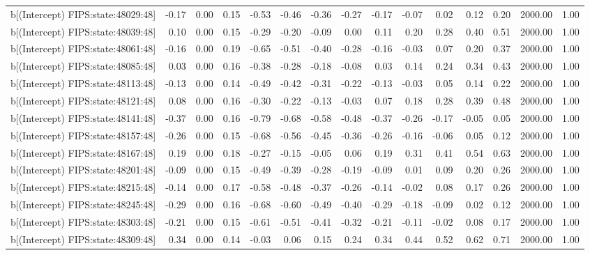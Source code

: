 \begin{table}[ht]
\begin{tabular}{rrrrrrrrrrrrrrr}
  b[(Intercept) FIPS:state:48029:48] & -0.17 & 0.00 & 0.15 & -0.53 & -0.46 & -0.36 & -0.27 & -0.17 & -0.07 & 0.02 & 0.12 & 0.20 & 2000.00 & 1.00 \\ 
  b[(Intercept) FIPS:state:48039:48] & 0.10 & 0.00 & 0.15 & -0.29 & -0.20 & -0.09 & 0.00 & 0.11 & 0.20 & 0.28 & 0.40 & 0.51 & 2000.00 & 1.00 \\ 
  b[(Intercept) FIPS:state:48061:48] & -0.16 & 0.00 & 0.19 & -0.65 & -0.51 & -0.40 & -0.28 & -0.16 & -0.03 & 0.07 & 0.20 & 0.37 & 2000.00 & 1.00 \\ 
  b[(Intercept) FIPS:state:48085:48] & 0.03 & 0.00 & 0.16 & -0.38 & -0.28 & -0.18 & -0.08 & 0.03 & 0.14 & 0.24 & 0.34 & 0.43 & 2000.00 & 1.00 \\ 
  b[(Intercept) FIPS:state:48113:48] & -0.13 & 0.00 & 0.14 & -0.49 & -0.42 & -0.31 & -0.22 & -0.13 & -0.03 & 0.05 & 0.14 & 0.22 & 2000.00 & 1.00 \\ 
  b[(Intercept) FIPS:state:48121:48] & 0.08 & 0.00 & 0.16 & -0.30 & -0.22 & -0.13 & -0.03 & 0.07 & 0.18 & 0.28 & 0.39 & 0.48 & 2000.00 & 1.00 \\ 
  b[(Intercept) FIPS:state:48141:48] & -0.37 & 0.00 & 0.16 & -0.79 & -0.68 & -0.58 & -0.48 & -0.37 & -0.26 & -0.17 & -0.05 & 0.05 & 2000.00 & 1.00 \\ 
  b[(Intercept) FIPS:state:48157:48] & -0.26 & 0.00 & 0.15 & -0.68 & -0.56 & -0.45 & -0.36 & -0.26 & -0.16 & -0.06 & 0.05 & 0.12 & 2000.00 & 1.00 \\ 
  b[(Intercept) FIPS:state:48167:48] & 0.19 & 0.00 & 0.18 & -0.27 & -0.15 & -0.05 & 0.06 & 0.19 & 0.31 & 0.41 & 0.54 & 0.63 & 2000.00 & 1.00 \\ 
  b[(Intercept) FIPS:state:48201:48] & -0.09 & 0.00 & 0.15 & -0.49 & -0.39 & -0.28 & -0.19 & -0.09 & 0.01 & 0.09 & 0.20 & 0.26 & 2000.00 & 1.00 \\ 
  b[(Intercept) FIPS:state:48215:48] & -0.14 & 0.00 & 0.17 & -0.58 & -0.48 & -0.37 & -0.26 & -0.14 & -0.02 & 0.08 & 0.17 & 0.26 & 2000.00 & 1.00 \\ 
  b[(Intercept) FIPS:state:48245:48] & -0.29 & 0.00 & 0.16 & -0.68 & -0.60 & -0.49 & -0.40 & -0.29 & -0.18 & -0.09 & 0.02 & 0.12 & 2000.00 & 1.00 \\ 
  b[(Intercept) FIPS:state:48303:48] & -0.21 & 0.00 & 0.15 & -0.61 & -0.51 & -0.41 & -0.32 & -0.21 & -0.11 & -0.02 & 0.08 & 0.17 & 2000.00 & 1.00 \\ 
  b[(Intercept) FIPS:state:48309:48] & 0.34 & 0.00 & 0.14 & -0.03 & 0.06 & 0.15 & 0.24 & 0.34 & 0.44 & 0.52 & 0.62 & 0.71 & 2000.00 & 1.00 \\ 

\end{tabular}
\end{table}
